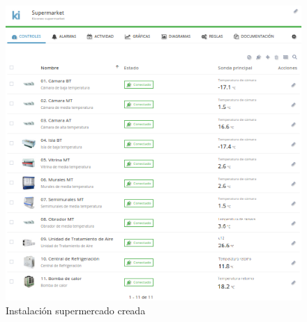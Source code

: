 \vspace*{\fill}

\begin{figure}[H]
  \centering
  \includegraphics[width=\textwidth, keepaspectratio]{img/instalacionConectada}
  \caption{Instalación supermercado creada}
  \label{figura:instalcionCreada}
\end{figure}

\vspace*{\fill}